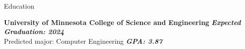 \documentclass{resume} %
\begin{document}
\vspace*{-\baselineskip}







\begin{rSection}{Education}

	\smallskip
	{\bf University of Minnesota College of Science and Engineering} \hfill {\bf{\em Expected Graduation: 2024}} \\ 
	Predicted major: Computer Engineering  \hfill {\bf{\em GPA: 3.87}}\\
	

\end{rSection}
\vspace*{-\baselineskip}
\end{document}
